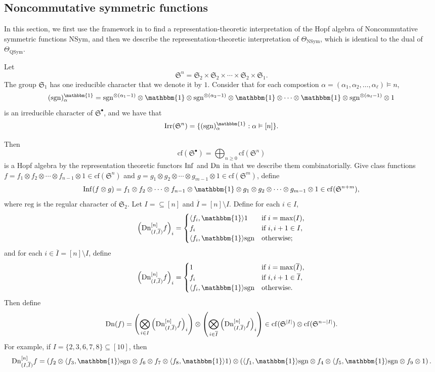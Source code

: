 \documentclass[11pt]{amsart}
\numberwithin{equation}{section}
\newcommand{\NSym}{\mathrm{NSym}}
\newcommand{\QSym}{\mathrm{QSym}}
\newcommand{\bbmone}{{\mathbbm{1}}}
\newcommand{\frakS}{{\mathfrak{S}}}
\newcommand{\cf}{{\mathrm{cf}}}
\newcommand{\sgn}{{\mathrm{sgn}}}
\newcommand{\reg}{{\mathrm{reg}}}
\begin{document}
\subsection{Noncommutative symmetric functions} In this section, we first use the framework in \cite{AT} to find a representation-theoretic interpretation of the Hopf algebra of Noncommutative symmetric functions $\NSym$, and then we describe the representation-theoretic interpretation of $\Theta_\NSym$, which is identical to the dual of $\Theta_\QSym$.

Let $$\frakS^n = \frakS_2\times \frakS_2\times \cdots \times \frakS_2\times \frakS_1.$$ The group $\frakS_1$ has one ireducible character that we denote it by $1$. Consider that for each compostion $\alpha=(\alpha_1,\alpha_2, \dots, \alpha_{\ell})\vDash n$, 
$$(\sgn)_\alpha^{\bbmone}=\sgn^{\otimes(\alpha_1-1)} \otimes \bbmone \otimes \sgn^{\otimes(\alpha_2-1)} \otimes \bbmone \otimes  \cdots \otimes \bbmone \otimes \sgn^{\otimes(\alpha_{\ell}-1)} \otimes 1$$ is an irreducible character of $\frakS^\bullet$, and we have that 
$${\rm Irr}(\frakS^n)=\{(\sgn)_\alpha^{\bbmone}: \alpha\vDash [n]\}.$$ 


Then 
$$\cf(\frakS^\bullet)=\bigoplus_{n\geq 0} \cf(\frakS^n)$$ is a Hopf algebra by the representation theoretic functors ${\rm Inf}$ and ${\rm Dn}$ in \cite[(3.1) and (3.2)]{AT} that we describe them combinatorially. Give class functions $f=f_1\otimes f_2\otimes \cdots \otimes f_{n-1} \otimes 1\in \cf(\frakS^n)$ and $g=g_1\otimes g_2\otimes \cdots \otimes g_{m-1} \otimes 1\in \cf(\frakS^m)$, define
$${\rm Inf}(f\otimes g)=f_1\otimes f_2\otimes \cdots \otimes f_{n-1} \otimes \bbmone \otimes g_1\otimes g_2\otimes \cdots \otimes g_{m-1} \otimes 1\in \cf(\frakS^{n+m}),$$
where $\reg$ is the regular character of $\frakS_2$. Let $I=\subseteq [n]$ and $\overline{I}= [n]\setminus I$. Define for each $i\in I$, 
$$\left({\rm Dn}_{(I,\overline{I})}^{[n]}f\right)_i=\begin{cases}
\langle f_i, \bbmone \rangle 1 & \text{if $i=\max(I)$},\\
f_i & \text{if $i,i+1\in I$},\\
\langle f_i, \bbmone \rangle \sgn & \text{otherwise;} 
\end{cases}$$
and for each $i\in \overline{I}=[n]\setminus I$, define
$$\left({\rm Dn}_{(I,\overline{I})}^{[n]}f\right)_i=\begin{cases}
1 & \text{if $i=\max(\overline{I})$},\\
f_i & \text{if $i,i+1\in \overline{I}$},\\
\langle f_i, \bbmone \rangle \sgn & \text{otherwise.} 
\end{cases}$$
Then define 
$${\rm Dn}(f)=\left(\bigotimes_{i\in I} \left({\rm Dn}_{(I,\overline{I})}^{[n]} f\right)_i \right) \otimes \left(\bigotimes_{i\in \overline{I}} \left({\rm Dn}_{(I,\overline{I})}^{[n]} f\right)_i\right)\in \cf(\frakS^{|I|})\otimes \cf(\frakS^{n-|I|}).$$ 
For example, if $I=\{2,3,6,7,8\}\subseteq [10]$, then 
$${\rm Dn}_{(I,\overline{I})}^{[n]} f = \left(f_2\otimes \langle f_3, \bbmone\rangle \sgn \otimes f_6 \otimes f_7 \otimes \langle f_8, \bbmone\rangle 1\right) \otimes \left(\langle f_1, \bbmone \rangle \sgn \otimes f_4\otimes \langle f_5, \bbmone \rangle \sgn \otimes f_9\otimes 1 \right).$$
\end{document}
